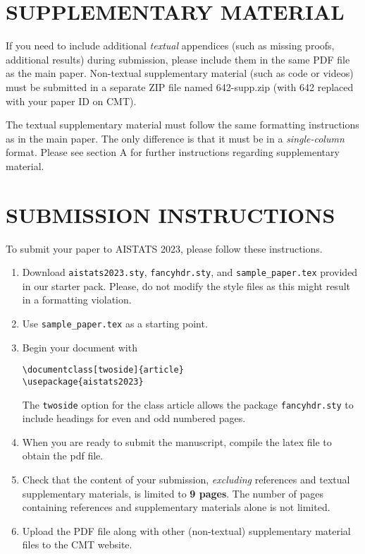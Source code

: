 \documentclass[twoside]{article}
\begin{document}
\section{SUPPLEMENTARY MATERIAL}

If you need to include additional \textit{textual} appendices (such as missing proofs, additional results) during submission, please include them in the same PDF file as the main paper. Non-textual supplementary material (such as code or videos) must be submitted in a separate ZIP file named 642-supp.zip (with 642 replaced with your paper ID on CMT).

The textual supplementary material must follow the same formatting instructions as in the main paper.
The only difference is that it must be in a \emph{single-column} format. Please see section A for further instructions regarding supplementary material.

\section{SUBMISSION INSTRUCTIONS}

To submit your paper to AISTATS 2023, please follow these instructions.

\begin{enumerate}
  \item Download \texttt{aistats2023.sty}, \texttt{fancyhdr.sty}, and \texttt{sample\_paper.tex} provided in our starter pack.
        Please, do not modify the style files as this might result in a formatting violation.

  \item Use \texttt{sample\_paper.tex} as a starting point.
  \item Begin your document with
        \begin{flushleft}
          \texttt{\textbackslash documentclass[twoside]\{article\}}\\
          \texttt{\textbackslash usepackage\{aistats2023\}}
        \end{flushleft}
        The \texttt{twoside} option for the class article allows the
        package \texttt{fancyhdr.sty} to include headings for even and odd
        numbered pages.
  \item When you are ready to submit the manuscript, compile the latex file to obtain the pdf file.
  \item Check that the content of your submission, \emph{excluding} references and textual supplementary materials, is limited to \textbf{9 pages}. The number of pages containing references and supplementary materials alone is not limited.
  \item Upload the PDF file along with other (non-textual) supplementary material files to the CMT website.
\end{enumerate}
\end{document}
